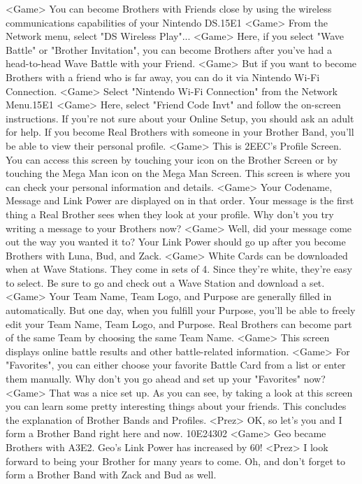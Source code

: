 <Game> You can become Brothers with Friends close by 
using the wireless communications capabilities of your Nintendo DS.{15}{E1} 
<Game> From the Network menu, select "DS Wireless Play"... 
<Game> Here, if you select "Wave Battle" or "Brother Invitation", you 
can become Brothers after you've had a head-to-head Wave Battle with your Friend. 
<Game> But if you want to become Brothers with a friend who is far away, 
you can do it via Nintendo Wi-Fi Connection. 
<Game> Select "Nintendo Wi-Fi  Connection" from the Network Menu.{15}{E1} 
<Game> Here, select "Friend Code Invt" and follow the on-screen instructions. 
If you're not sure about your Online Setup, you  should ask an adult for help. 
If you become Real Brothers with someone in your Brother Band, 
you'll be able to view their personal profile. 
<Game> This is {2E}{EC}'s Profile Screen. 
You can access this screen by touching your icon on the Brother Screen or by 
touching the Mega Man icon on the Mega Man Screen. 
This screen is where you can check your personal information and details. 
<Game> Your Codename, Message and Link Power are displayed on in that order. Your 
message is the first thing a Real Brother sees when they look at your profile. 
Why don't you try writing a message to your Brothers now? 
<Game> Well, did your message come out the way you wanted it to? Your Link Power should 
go up after you become Brothers with Luna, Bud, and Zack. 
<Game> White Cards can be downloaded when at Wave Stations. 
They come in sets of 4. Since they're white, they're easy to select. 
Be sure to go and check out a Wave Station and download a set. 
<Game> Your Team Name, Team Logo, and Purpose are generally filled in automatically. 
But one day, when you fulfill your Purpose, 
you'll be able to freely edit your Team Name, Team Logo, and Purpose. 
Real Brothers can become part of the same Team by 
choosing the same Team Name. 
<Game> This screen displays online battle results and other battle-related information. 
<Game> For "Favorites", you can either choose your favorite 
Battle Card from a list or enter them manually. 
Why don't you go ahead and set up your "Favorites" now? 
<Game> That was a nice set up. 
As you can see, by taking a look at this screen you can 
learn some pretty interesting things about your friends. 
This concludes the explanation of Brother Bands and Profiles. 
<Prez> OK, so let's you and I form a Brother Band right here and now. 
{10}{E2}{43}{02} 
<Game> Geo became Brothers with {A3}{E2}. 
Geo's Link Power has increased by 60! 
<Prez> I look forward to being your Brother for many years to come. 
Oh, and don't forget to form a Brother Band with Zack and Bud as well. 
